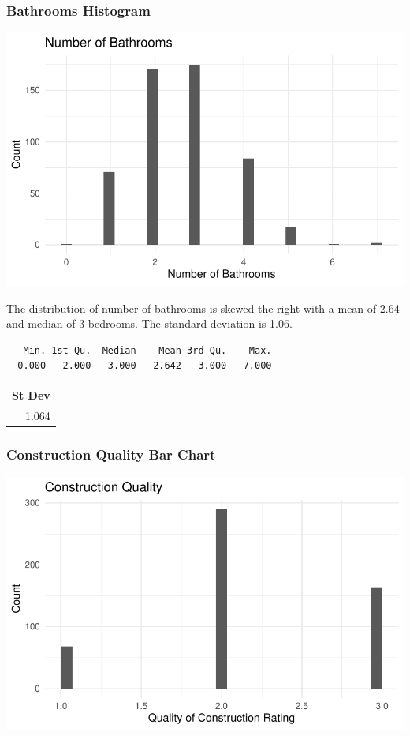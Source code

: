 \documentclass[
  letterpaper,
  DIV=11,
  numbers=noendperiod]{scrartcl}
\begin{document}
\hypertarget{bathrooms-histogram}{%
\subsubsection{Bathrooms Histogram}\label{bathrooms-histogram}}

\includegraphics{final_project_files/figure-pdf/unnamed-chunk-7-1.pdf}

The distribution of number of bathrooms is skewed the right with a mean
of 2.64 and median of 3 bedrooms. The standard deviation is 1.06.

\begin{verbatim}
   Min. 1st Qu.  Median    Mean 3rd Qu.    Max. 
  0.000   2.000   3.000   2.642   3.000   7.000 
\end{verbatim}

\begin{tabular}{r}
\hline
St Dev\\
\hline
1.064\\
\hline
\end{tabular}

\hypertarget{construction-quality-bar-chart}{%
\subsubsection{Construction Quality Bar
Chart}\label{construction-quality-bar-chart}}

\includegraphics{final_project_files/figure-pdf/unnamed-chunk-9-1.pdf}
\end{document}
